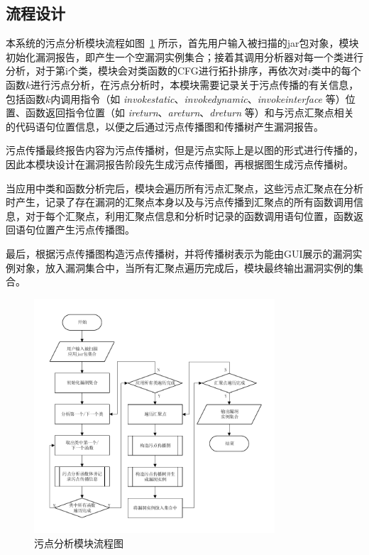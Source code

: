 \subsection{流程设计}
本系统的污点分析模块流程如图~\ref{taintprocess} 所示，首先用户输入被扫描的jar包对象，模块初始化漏洞报告，即产生一个空漏洞实例集合；接着其调用分析器对每一个类进行分析，对于第i个类，模块会对类函数的CFG进行拓扑排序，再依次对$i$类中的每个函数$k$进行污点分析，在污点分析时，本模块需要记录关于污点传播的有关信息，包括函数$k$内调用指令（如 \textit{invokestatic}、\textit{invokedynamic}、\textit{invokeinterface} 等）位置、函数返回指令位置（如 \textit{ireturn}、\textit{areturn}、\textit{dreturn} 等）和与污点汇聚点相关的代码语句位置信息，以便之后通过污点传播图和传播树产生漏洞报告。

污点传播最终报告内容为污点传播树，但是污点实际上是以图的形式进行传播的，因此本模块设计在漏洞报告阶段先生成污点传播图，再根据图生成污点传播树。

当应用中类和函数分析完后，模块会遍历所有污点汇聚点，这些污点汇聚点在分析时产生，记录了存在漏洞的汇聚点本身以及与污点传播到汇聚点的所有函数调用信息，对于每个汇聚点，利用汇聚点信息和分析时记录的函数调用语句位置，函数返回语句位置产生污点传播图。

最后，根据污点传播图构造污点传播树，并将传播树表示为能由GUI展示的漏洞实例对象，放入漏洞集合中，当所有汇聚点遍历完成后，模块最终输出漏洞实例的集合。

\begin{figure}[!htb]
	\centering
	\includegraphics[width=0.8\textwidth]{FIGs/chapter3/taintprocessing.pdf}
	\caption{污点分析模块流程图}\label{taintprocess}
\end{figure}

